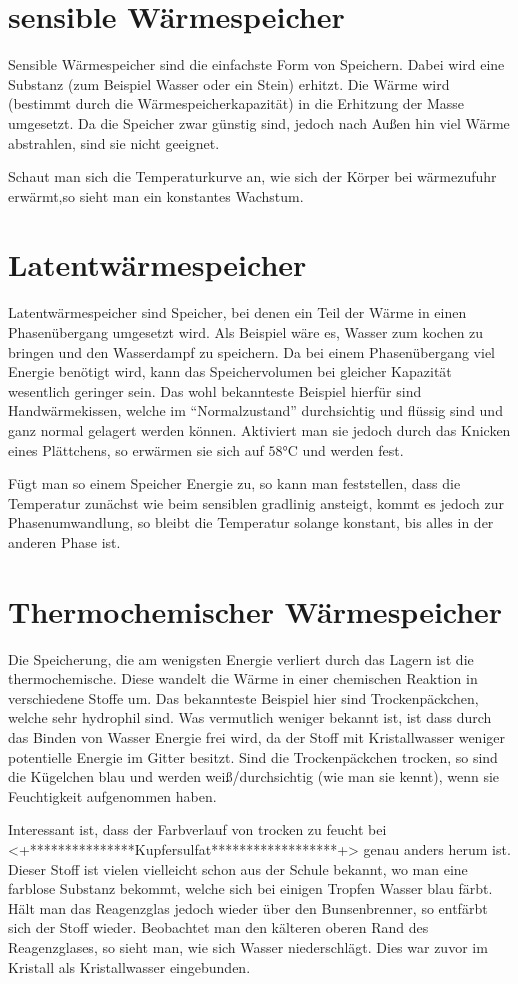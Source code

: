 \documentclass[12pt,a4paper,titlepage,headinclude,bibtotoc]{scrartcl}
\begin{document}
\section{sensible Wärmespeicher}
Sensible Wärmespeicher sind die einfachste Form von Speichern.
Dabei wird eine Substanz (zum Beispiel Wasser oder ein Stein) erhitzt.
Die Wärme wird (bestimmt durch die Wärmespeicherkapazität) in die Erhitzung der Masse umgesetzt.
Da die Speicher zwar günstig sind, jedoch nach Außen hin viel Wärme abstrahlen, sind sie nicht geeignet.

Schaut man sich die Temperaturkurve an, wie sich der Körper bei wärmezufuhr erwärmt,so sieht man ein konstantes Wachstum.

\section{Latentwärmespeicher}
Latentwärmespeicher sind Speicher, bei denen ein Teil der Wärme in einen Phasenübergang umgesetzt wird.
Als Beispiel wäre es, Wasser zum kochen zu bringen und den Wasserdampf zu speichern.
Da bei einem Phasenübergang viel Energie benötigt wird, kann das Speichervolumen bei gleicher Kapazität wesentlich geringer sein.
Das wohl bekannteste Beispiel hierfür sind Handwärmekissen, welche im "`Normalzustand"' durchsichtig und flüssig sind und ganz normal gelagert werden können.
Aktiviert man sie jedoch durch das Knicken eines Plättchens, so erwärmen sie sich auf $58\si\celsius$ und werden fest.

Fügt man so einem Speicher Energie zu, so kann man feststellen, dass die Temperatur zunächst wie beim sensiblen gradlinig ansteigt, kommt es jedoch zur Phasenumwandlung, so bleibt die Temperatur solange konstant, bis alles in der anderen Phase ist.




\section{Thermochemischer Wärmespeicher}
Die Speicherung, die am wenigsten Energie verliert durch das Lagern ist die thermochemische.
Diese wandelt die Wärme in einer chemischen Reaktion in verschiedene Stoffe um.
Das bekannteste Beispiel hier sind Trockenpäckchen, welche sehr hydrophil sind.
Was vermutlich weniger bekannt ist, ist dass durch das Binden von Wasser Energie frei wird, da der Stoff mit Kristallwasser weniger potentielle Energie im Gitter besitzt.
Sind die Trockenpäckchen trocken, so sind die Kügelchen blau und werden weiß/durchsichtig (wie man sie kennt), wenn sie Feuchtigkeit aufgenommen haben.

Interessant ist, dass der Farbverlauf von trocken zu feucht bei <+***************Kupfersulfat******************+> genau anders herum ist.
Dieser Stoff ist vielen vielleicht schon aus der Schule bekannt, wo man eine farblose Substanz bekommt, welche sich bei einigen Tropfen Wasser blau färbt.
Hält man das Reagenzglas jedoch wieder über den Bunsenbrenner, so entfärbt sich der Stoff wieder.
Beobachtet man den kälteren oberen Rand des Reagenzglases, so sieht man, wie sich Wasser niederschlägt.
Dies war zuvor im Kristall als Kristallwasser eingebunden.
\end{document}
